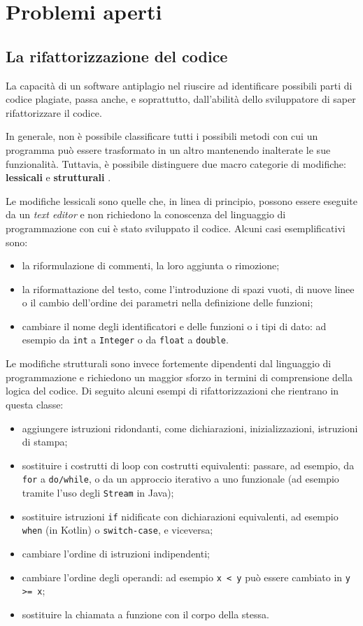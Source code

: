\section{Problemi aperti}

\subsection{La rifattorizzazione del codice}
La capacità di un software antiplagio nel riuscire ad identificare possibili parti di codice plagiate, passa anche, e soprattutto, dall'abilità dello sviluppatore di saper rifattorizzare il codice.

In generale, non è possibile classificare tutti i possibili metodi con cui un programma può essere trasformato in un altro mantenendo inalterate le sue funzionalità.
%
Tuttavia, è possibile distinguere due macro categorie di modifiche: \textbf{lessicali} e \textbf{strutturali} \cite{joy-99}.

Le modifiche lessicali sono quelle che, in linea di principio, possono essere eseguite da un \textit{text editor} e non richiedono la conoscenza del linguaggio di programmazione con cui è stato sviluppato il codice. 
%
Alcuni casi esemplificativi sono:
\begin{itemize}
    \item la riformulazione di commenti, la loro aggiunta o rimozione;
    \item la riformattazione del testo, come l'introduzione di spazi vuoti, di nuove linee o il cambio dell'ordine dei parametri nella definizione delle funzioni;
    \item cambiare il nome degli identificatori e delle funzioni o i tipi di dato: ad esempio da \texttt{int} a \texttt{Integer} o da \texttt{float} a \texttt{double}.
\end{itemize}

Le modifiche strutturali sono invece fortemente dipendenti dal linguaggio di programmazione e richiedono un maggior sforzo in termini di comprensione della logica del codice.
%
Di seguito alcuni esempi di rifattorizzazioni che rientrano in questa classe:
\begin{itemize}
    \item aggiungere istruzioni ridondanti, come dichiarazioni, inizializzazioni, istruzioni di stampa;
    \item sostituire i costrutti di loop con costrutti equivalenti: passare, ad esempio, da \texttt{for} a \texttt{do/while}, o da un approccio iterativo a uno funzionale (ad esempio tramite l'uso degli \texttt{Stream} in Java);
    \item sostituire istruzioni \texttt{if} nidificate con dichiarazioni equivalenti, ad esempio \texttt{when} (in Kotlin) o \texttt{switch-case}, e viceversa;
    \item cambiare l'ordine di istruzioni indipendenti;
    \item cambiare l'ordine degli operandi: ad esempio \texttt{x < y} può essere cambiato in \texttt{y >= x};
    \item sostituire la chiamata a funzione con il corpo della stessa.
\end{itemize}

